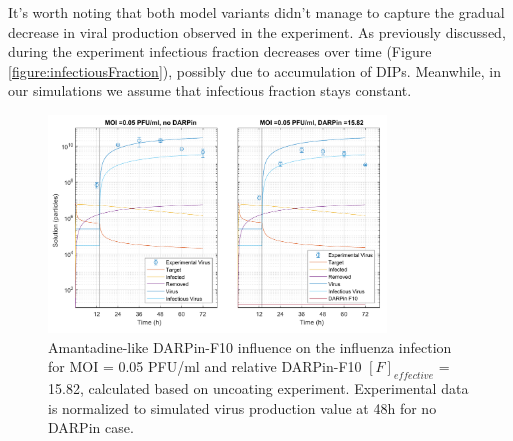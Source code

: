 It's worth noting that both model variants didn't manage to capture the gradual decrease in viral production observed in the experiment. As previously discussed, during the experiment infectious fraction decreases over time (Figure \ref{figure:infectiousFraction}), possibly due to accumulation of DIPs. Meanwhile, in our simulations we assume that infectious fraction stays constant.

\begin{figure}
\begin{center}
\includegraphics[width=0.8\textwidth, trim={0cm 0cm 0cm 0cm}, clip]{D_chapters/3_DARPinModels/2_DARPinInfection/comparisonModelTHillIRVViDelayMOI0.072135DARPin15.816AsymmetricDarpinMyosinInhibitor.pdf}
\caption[Amantadine-like DARPin-F10 for MOI = 0.05 PFU/ml and $F_{effective}$ = 15.82]{Amantadine-like DARPin-F10 influence on the influenza infection for MOI = 0.05 PFU/ml and relative DARPin-F10 $[F]_{effective}$ = 15.82, calculated based on uncoating experiment. Experimental data is normalized to simulated virus production value at 48h for no DARPin case.}
\label{figure:amantadineLikeF15}
\end{center}
\end{figure}

